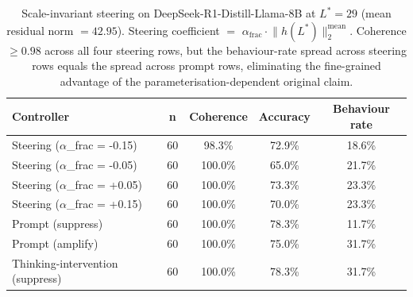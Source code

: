 \begin{table}[t]
\centering
\caption{Scale-invariant steering on DeepSeek-R1-Distill-Llama-8B at $L^* = 29$ (mean residual norm $ = 42.95$). Steering coefficient $=$ $\alpha_{\mathrm{frac}} \cdot \lVert h(L^*) \rVert_2^{\mathrm{mean}}$. Coherence $\geq 0.98$ across all four steering rows, but the behaviour-rate spread across steering rows equals the spread across prompt rows, eliminating the fine-grained advantage of the parameterisation-dependent original claim.}
\label{tab:c4v2_scale_invariance}
\begin{tabular}{lcccc}
\toprule
Controller & n & Coherence & Accuracy & Behaviour rate \\
\midrule
Steering ($\alpha$\_frac = -0.15) & 60 & 98.3\% & 72.9\% & 18.6\% \\
Steering ($\alpha$\_frac = -0.05) & 60 & 100.0\% & 65.0\% & 21.7\% \\
Steering ($\alpha$\_frac = +0.05) & 60 & 100.0\% & 73.3\% & 23.3\% \\
Steering ($\alpha$\_frac = +0.15) & 60 & 100.0\% & 70.0\% & 23.3\% \\
Prompt (suppress) & 60 & 100.0\% & 78.3\% & 11.7\% \\
Prompt (amplify) & 60 & 100.0\% & 75.0\% & 31.7\% \\
Thinking-intervention (suppress) & 60 & 100.0\% & 78.3\% & 31.7\% \\
\bottomrule
\end{tabular}
\end{table}
